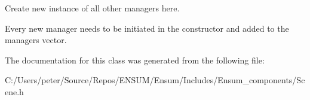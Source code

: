 Create new instance of all other managers here. 

Every new manager needs to be initiated in the constructor and added to the managers vector. 

The documentation for this class was generated from the following file\+:\begin{DoxyCompactItemize}
\item 
C\+:/\+Users/peter/\+Source/\+Repos/\+E\+N\+S\+U\+M/\+Ensum/\+Includes/\+Ensum\+\_\+components/Scene.\+h\end{DoxyCompactItemize}
